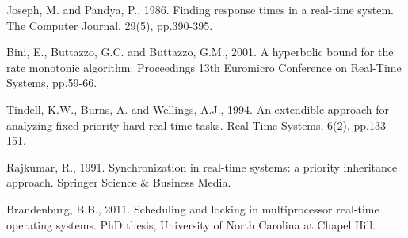 \documentclass[12pt,a4paper]{article}
\begin{document}
\begin{thebibliography}{20}
Joseph, M. and Pandya, P., 1986. Finding response times in a real-time system. The Computer Journal, 29(5), pp.390-395.

Bini, E., Buttazzo, G.C. and Buttazzo, G.M., 2001. A hyperbolic bound for the rate monotonic algorithm. Proceedings 13th Euromicro Conference on Real-Time Systems, pp.59-66.

Tindell, K.W., Burns, A. and Wellings, A.J., 1994. An extendible approach for analyzing fixed priority hard real-time tasks. Real-Time Systems, 6(2), pp.133-151.

Rajkumar, R., 1991. Synchronization in real-time systems: a priority inheritance approach. Springer Science \& Business Media.

Brandenburg, B.B., 2011. Scheduling and locking in multiprocessor real-time operating systems. PhD thesis, University of North Carolina at Chapel Hill.

\end{thebibliography}
\end{document}
